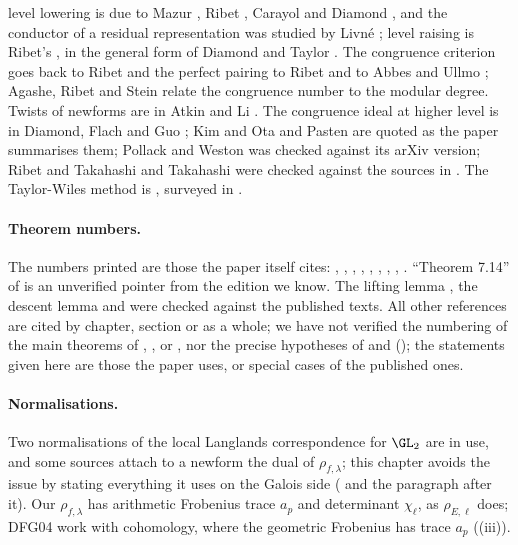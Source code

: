 level lowering is due to Mazur \cite{Mazur77}, Ribet \cite{Ribet90,Ribet91}, Carayol \cite{Carayol89} and Diamond \cite{Diamond95}, and the conductor of a residual
representation was studied by Livn\'e \cite{Livne89}; level raising is Ribet's \cite{Ribet84}, in the general form of Diamond and Taylor \cite{DiamondTaylor94}. The
congruence criterion goes back to Ribet \cite{Ribet83} and the perfect pairing to Ribet and to Abbes and Ullmo \cite{AU96}; Agashe, Ribet and Stein \cite{ARS12}
relate the congruence number to the modular degree. Twists of newforms are in Atkin and Li \cite{AtkinLi78}. The congruence ideal at higher level is
in Diamond, Flach and Guo \cite{DFG04}; Kim and Ota \cite{KimOta} and Pasten \cite{Pasten} are quoted as the paper summarises them; Pollack and Weston \cite[Theorem 6.11]{PollackWeston11} was checked against its arXiv version;
Ribet and Takahashi \cite{RibetTakahashi97} and Takahashi \cite{Takahashi01} were checked against the sources in . The Taylor-Wiles method is \cite{Wiles95,TaylorWiles}, surveyed in \cite{DDT}.

\paragraph{Theorem numbers.} The numbers printed are those the paper itself cites: \cite[Theorems 3.1(e), 3.15]{DDT}, \cite[Theorem 2.2]{Ribet83},
\cite[Lemma 2.1]{AU96}, \cite[Theorem 3]{AtkinLehner70}, \cite[Theorem 3.1]{AtkinLi78}, \cite[Theorem 2.2]{ARS12}, \cite[Section 2]{Edixhoven92}, \cite[Proposition 1.4(c)]{DFG04},
\cite[Theorem 1.3, Definition 1.15]{KimOta}. ``Theorem 7.14'' of \cite{Shimura71} is an unverified pointer from the edition we know. The lifting lemma \cite[Lemme 6.11]{DeligneSerre74},
the descent lemma \cite[Lemme 6.13]{DeligneSerre74} and \cite[Th\'eor\`eme 2]{Carayol94} were checked against the published texts. All other references are cited by
chapter, section or as a whole; we have not verified the numbering of the main theorems of \cite{Carayol86}, \cite{Ribet84}, \cite{Ribet90} or \cite{DiamondTaylor94},
nor the precise hypotheses of \cite{Ribet84} and \cite{Carayol89} (); the statements given here are those the
paper uses, or special cases of the published ones.

\paragraph{Normalisations.} Two normalisations of the local Langlands correspondence for $\GL_2$ are in use, and some sources attach to a newform the
dual of $\rho_{f,\lambda}$; this chapter avoids the issue by stating everything it uses on the Galois side ( and the paragraph after it).
Our $\rho_{f,\lambda}$ has arithmetic Frobenius trace $a_p$ and determinant $\chi_\ell$, as $\rho_{E,\ell}$ does; DFG04 work with cohomology, where the geometric Frobenius has
trace $a_p$ ((iii)).

